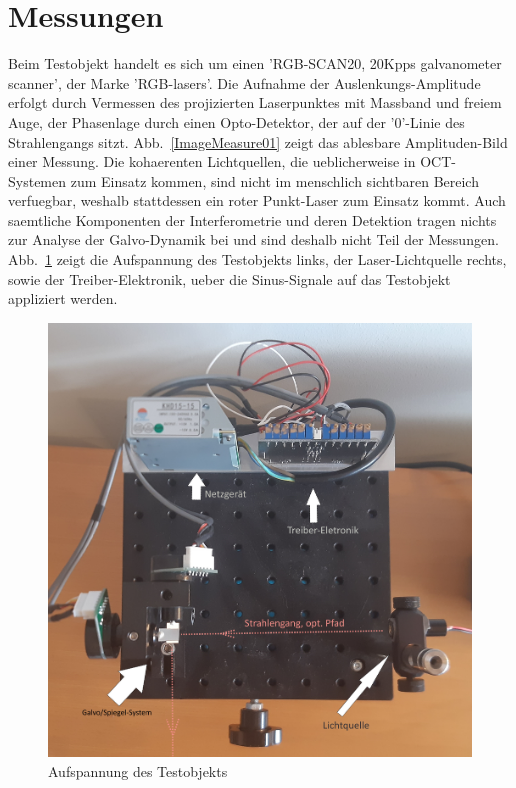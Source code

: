 \section{Messungen}
Beim Testobjekt handelt es sich um einen 'RGB-SCAN20, 20Kpps galvanometer scanner', der Marke 'RGB-lasers'. Die Aufnahme der Auslenkungs-Amplitude erfolgt durch Vermessen des projizierten Laserpunktes mit Massband und freiem Auge, der Phasenlage durch einen Opto-Detektor, der auf der '0'-Linie des Strahlengangs sitzt. Abb.~\ref{ImageMeasure01} zeigt das ablesbare Amplituden-Bild einer Messung. Die kohaerenten Lichtquellen, die ueblicherweise in OCT-Systemen zum Einsatz kommen, sind nicht im menschlich sichtbaren Bereich verfuegbar, weshalb stattdessen ein roter Punkt-Laser zum Einsatz kommt. Auch saemtliche Komponenten der Interferometrie und deren Detektion tragen nichts zur Analyse der Galvo-Dynamik bei und sind deshalb nicht Teil der Messungen. Abb.~\ref{DutTop02} zeigt die Aufspannung des Testobjekts links, der Laser-Lichtquelle rechts, sowie der Treiber-Elektronik, ueber die Sinus-Signale auf das Testobjekt appliziert werden.
\begin{figure}[h!]	\centering	\includegraphics[width=\bildwidth]{pics/DutTop02.jpg}	\caption{Aufspannung des Testobjekts}	\label{DutTop02}	\end{figure}
